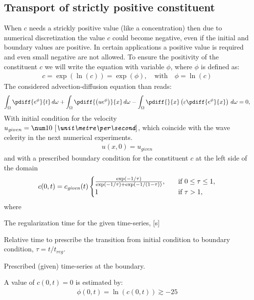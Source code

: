 \subsection{Transport of strictly positive constituent}
When $c$ needs a strickly positive value (like a concentration) then due to numerical discretization the value $c$ could become negative, even if the initial and boundary values are positive.
In certain applications a positive value is required and even small negative are not allowed.
To ensure the positivity of the constituent $c$ we will write the equation with variable $\phi$, where $\phi$ is defined as:
\begin{align}
    c = \exp(\ln(c)) =  \exp(\phi), \quad \text{with} \quad \phi = \ln(c)
\end{align}
The considered advection-diffusion equation than reads:
\begin{align}
    \int_\Omega\pdiff{{e^\phi}}{t} \, d\omega
    + \int_\Omega\pdiff{\left(u{e^\phi}\right)}{x} \, d\omega
    - \int_\Omega\pdiff{}{x}\left(\eps \pdiff{{e^\phi}}{x}\right)\, d\omega = 0,\label{eq:1d_advec_phi_num}
\end{align}
With initial condition for the velocity $u_{\mathit given} = \bqty{10}{\metre\per\second}$, which coincide with the wave celerity in the next numerical experiments.
\begin{align}
    u(x,0) = u_{\mathit given}
\end{align}
and with a prescribed boundary condition for the constituent $c$ at the left side of the domain
\begin{align}
    c(0,t) = c_{\it given}(t)
    \begin{cases}
        \frac{\exp(-1/\tau) }{ \exp(-1/\tau) + \exp(-1 / (1 - \tau))},
        &\quad \text{if\ }0 \leq \tau \leq 1,
        \\
        1 &\quad \text{if\ }\tau > 1,
    \end{cases}
    \label{eq:1d_burgers_boundary_condition_a}
\end{align}
where
\begin{symbollist}
    \item[$t_{reg}$] The regularization time for the given time-series, [\si{\second}]
    \item[$\tau$] Relative time to prescribe the transition from initial condition to boundary condition, $\tau = t/t_{reg}$.
    \item[$c_{\it given}(t)$] Prescribed (given) time-series at the boundary.
\end{symbollist}
A value of $c(0,t)=0$ is estimated by:
\begin{align}
    \phi(0,t) = \ln(c(0,t)) \gtrsim -25
\end{align}
